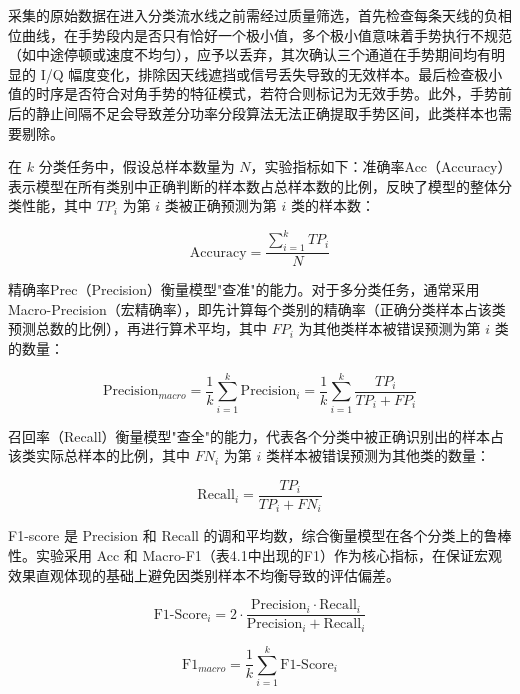 采集的原始数据在进入分类流水线之前需经过质量筛选，首先检查每条天线的负相位曲线，在手势段内是否只有恰好一个极小值，多个极小值意味着手势执行不规范（如中途停顿或速度不均匀），应予以丢弃，其次确认三个通道在手势期间均有明显的 I/Q 幅度变化，排除因天线遮挡或信号丢失导致的无效样本。最后检查极小值的时序是否符合对角手势的特征模式，若符合则标记为无效手势。此外，手势前后的静止间隔不足会导致差分功率分段算法无法正确提取手势区间，此类样本也需要剔除。

在 $k$ 分类任务中，假设总样本数量为 $N$，实验指标如下：准确率Acc（Accuracy）表示模型在所有类别中正确判断的样本数占总样本数的比例，反映了模型的整体分类性能，其中 $TP_{i}$ 为第 $i$ 类被正确预测为第 $i$ 类的样本数：

\begin{equation}
    \mathrm{Accuracy} = \frac{\sum_{i=1}^{k}TP_{i}}{N}
\end{equation}

精确率Prec（Precision）衡量模型"查准"的能力。对于多分类任务，通常采用 Macro-Precision（宏精确率），即先计算每个类别的精确率（正确分类样本占该类预测总数的比例），再进行算术平均，其中 $FP_{i}$ 为其他类样本被错误预测为第 $i$ 类的数量：

\begin{equation}
    \mathrm{Precision}_{macro} = \frac{1}{k}\sum_{i=1}^{k}\mathrm{Precision}_{i} = \frac{1}{k}\sum_{i=1}^{k}\frac{TP_{i}}{TP_{i} + FP_{i}}
\end{equation}

召回率（Recall）衡量模型"查全"的能力，代表各个分类中被正确识别出的样本占该类实际总样本的比例，其中 $FN_{i}$ 为第 $i$ 类样本被错误预测为其他类的数量：

\begin{equation}
    \mathrm{Recall}_{i} = \frac{TP_{i}}{TP_{i} + FN_{i}}
\end{equation}

F1-score 是 Precision 和 Recall 的调和平均数，综合衡量模型在各个分类上的鲁棒性。实验采用 Acc 和 Macro-F1（表4.1中出现的F1）作为核心指标，在保证宏观效果直观体现的基础上避免因类别样本不均衡导致的评估偏差。

\begin{equation}
    \mathrm{F1\text{-}Score}_{i} = 2 \cdot \frac{\mathrm{Precision}_{i} \cdot \mathrm{Recall}_{i}}{\mathrm{Precision}_{i} + \mathrm{Recall}_{i}}
\end{equation}

\begin{equation}
    \mathrm{F1}_{macro} = \frac{1}{k}\sum_{i=1}^{k}\mathrm{F1\text{-}Score}_{i}
\end{equation}
